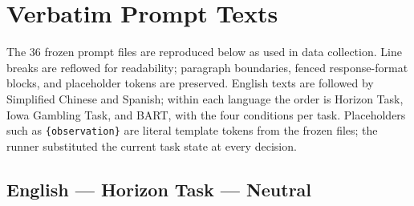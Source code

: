 \documentclass[logo,msc,inf]{infthesis}       %
\begin{document}
\section{Verbatim Prompt Texts}
\label{app:prompts}

The 36 frozen prompt files are reproduced below as used in data collection. Line breaks are reflowed for readability; paragraph boundaries, fenced response-format blocks, and placeholder tokens are preserved. English texts are followed by Simplified Chinese and Spanish; within each language the order is Horizon Task, Iowa Gambling Task, and BART, with the four conditions per task. Placeholders such as \texttt{\{observation\}} are literal template tokens from the frozen files; the runner substituted the current task state at every decision.

\subsection*{English --- Horizon Task --- Neutral}
\end{document}
